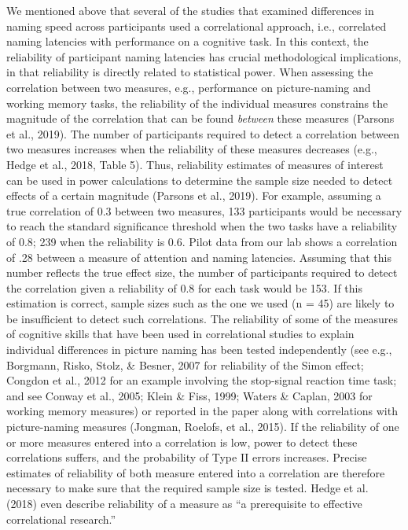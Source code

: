 \documentclass[
  man,floatsintext]{apa6}
\begin{document}
We mentioned above that several of the studies that examined differences in naming speed across participants used a correlational approach, i.e., correlated naming latencies with performance on a cognitive task. In this context, the reliability of participant naming latencies has crucial methodological implications, in that reliability is directly related to statistical power. When assessing the correlation between two measures, e.g., performance on picture-naming and working memory tasks, the reliability of the individual measures constrains the magnitude of the correlation that can be found \emph{between} these measures (Parsons et al., 2019). The number of participants required to detect a correlation between two measures increases when the reliability of these measures decreases (e.g., Hedge et al., 2018, Table 5). Thus, reliability estimates of measures of interest can be used in power calculations to determine the sample size needed to detect effects of a certain magnitude (Parsons et al., 2019). For example, assuming a true correlation of 0.3 between two measures, 133 participants would be necessary to reach the standard significance threshold when the two tasks have a reliability of 0.8; 239 when the reliability is 0.6. Pilot data from our lab shows a correlation of .28 between a measure of attention and naming latencies. Assuming that this number reflects the true effect size, the number of participants required to detect the correlation given a reliability of 0.8 for each task would be 153. If this estimation is correct, sample sizes such as the one we used (n = 45) are likely to be insufficient to detect such correlations. The reliability of some of the measures of cognitive skills that have been used in correlational studies to explain individual differences in picture naming has been tested independently (see e.g., Borgmann, Risko, Stolz, \& Besner, 2007 for reliability of the Simon effect; Congdon et al., 2012 for an example involving the stop-signal reaction time task; and see Conway et al., 2005; Klein \& Fiss, 1999; Waters \& Caplan, 2003 for working memory measures) or reported in the paper along with correlations with picture-naming measures (Jongman, Roelofs, et al., 2015). If the reliability of one or more measures entered into a correlation is low, power to detect these correlations suffers, and the probability of Type II errors increases. Precise estimates of reliability of both measure entered into a correlation are therefore necessary to make sure that the required sample size is tested. Hedge et al. (2018) even describe reliability of a measure as ``a prerequisite to effective correlational research.''
\end{document}
